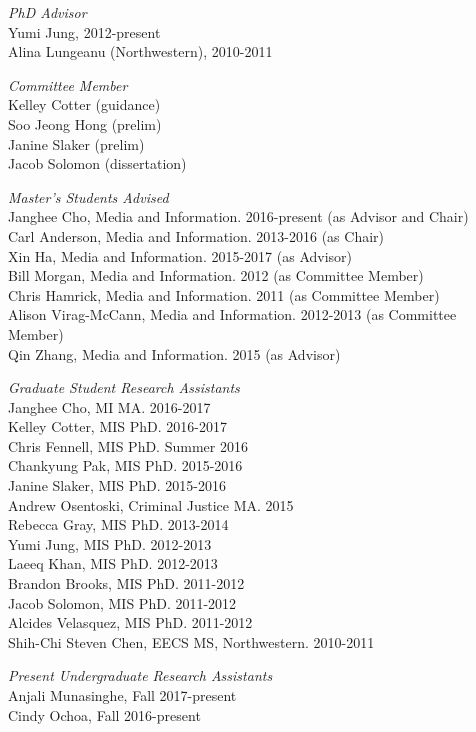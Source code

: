 \documentclass[9pt]{extarticle}
\begin{document}
\emph{PhD Advisor} \\
Yumi Jung, 2012-present \\
Alina Lungeanu (Northwestern), 2010-2011

\emph{Committee Member} \\
Kelley Cotter (guidance) \\
Soo Jeong Hong (prelim) \\
Janine Slaker (prelim) \\
Jacob Solomon (dissertation)

\emph{Master's Students Advised} \\
Janghee Cho, Media and Information. 2016-present (as Advisor and Chair) \\
Carl Anderson, Media and Information. 2013-2016 (as Chair) \\
Xin Ha, Media and Information. 2015-2017 (as Advisor) \\
Bill Morgan, Media and Information. 2012 (as Committee Member) \\
Chris Hamrick, Media and Information. 2011 (as Committee Member) \\
Alison Virag-McCann, Media and Information. 2012-2013 (as Committee Member) \\
Qin Zhang, Media and Information. 2015 (as Advisor)

\emph{Graduate Student Research Assistants} \\
Janghee Cho, MI MA. 2016-2017 \\
Kelley Cotter, MIS PhD. 2016-2017 \\
Chris Fennell, MIS PhD. Summer 2016 \\
Chankyung Pak, MIS PhD. 2015-2016 \\
Janine Slaker, MIS PhD. 2015-2016 \\
Andrew Osentoski, Criminal Justice MA. 2015 \\
Rebecca Gray, MIS PhD. 2013-2014 \\
Yumi Jung, MIS PhD. 2012-2013 \\
Laeeq Khan, MIS PhD. 2012-2013 \\
Brandon Brooks, MIS PhD. 2011-2012 \\
Jacob Solomon, MIS PhD. 2011-2012 \\
Alcides Velasquez, MIS PhD. 2011-2012 \\
Shih-Chi Steven Chen, EECS MS, Northwestern. 2010-2011

\emph{Present Undergraduate Research Assistants} \\
Anjali Munasinghe, Fall 2017-present \\
Cindy Ochoa, Fall 2016-present
\end{document}
